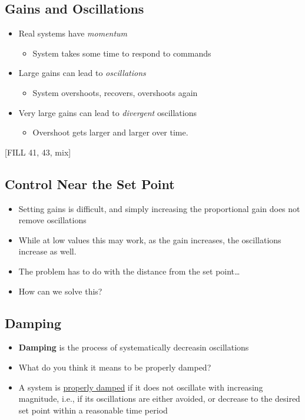 \documentclass[10pt]{article}
\begin{document}
\subsection*{Gains and Oscillations}
\begin{itemize}
	\item Real systems have \textit{momentum}
	\begin{itemize}
        \item System takes some time to respond to commands
    \end{itemize}
    \item Large gains can lead to \textit{oscillations}
    \begin{itemize}
        \item System overshoots, recovers, overshoots again
    \end{itemize}
    \item Very large gains can lead to \textit{divergent} oscillations
    \begin{itemize}
        \item Overshoot gets larger and larger over time.
    \end{itemize}
\end{itemize}
\begin{center} 
	[FILL 41, 43, mix]
\end{center}

\subsection*{Control Near the Set Point}
\begin{itemize}
	\item Setting gains is difficult, and simply increasing the proportional gain does not remove oscillations
	\item While at low values this may work, as the gain increases, the oscillations increase as well.
	\item The problem has to do with the distance from the set point\dots
	\item How can we solve this?
\end{itemize}

\subsection*{Damping}
\begin{itemize}
	\item \textbf{Damping} is the process of systematically decreasin oscillations
	\item What do you think it means to be properly damped?
	\item A system is \underline{properly damped} if it does not oscillate with increasing magnitude, i.e., if its oscillations are either avoided, or decrease to the desired set point within a reasonable time period
\end{itemize}
\end{document}
